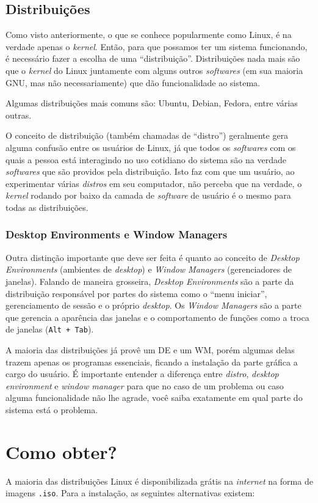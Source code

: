 \documentclass{handout_utfpr}
\begin{document}
\subsection{Distribuições}\label{distro}
Como visto anteriormente, o que se conhece popularmente como Linux, é na verdade apenas o \textit{kernel}. Então, para que possamos ter um sistema funcionando, é necessário fazer a escolha de uma ``distribuição''. Distribuições nada mais são que o \textit{kernel} do Linux juntamente com alguns outros \textit{softwares} (em sua maioria GNU, mas não necessariamente) que dão funcionalidade ao sistema.

Algumas distribuições mais comuns são: Ubuntu, Debian, Fedora, entre várias outras.

O conceito de distribuição (também chamadas de ``distro'') geralmente gera alguma confusão entre os usuários de Linux, já que todos os \textit{softwares} com os quais a pessoa está interagindo no uso cotidiano do sistema são na verdade \textit{softwares} que são providos pela distribuição. Isto faz com que um usuário, ao experimentar várias \textit{distros} em seu computador, não perceba que na verdade, o \textit{kernel} rodando por baixo da camada de \textit{software} de usuário é o mesmo para todas as distribuições.

\subsubsection{Desktop Environments e Window Managers}
Outra distinção importante que deve ser feita é quanto ao conceito de \textit{Desktop Environments} (ambientes de \textit{desktop}) e \textit{Window Managers} (gerenciadores de janelas). Falando de maneira grosseira, \textit{Desktop Environments} são a parte da distribuição responsável por partes do sistema como o ``menu iniciar'', gerenciamento de sessão e o próprio \textit{desktop}. Os \textit{Window Managers} são a parte que gerencia a aparência das janelas e o comportamento de funções como a troca de janelas (\texttt{Alt + Tab}).

A maioria das distribuições já provê um DE e um WM, porém algumas delas trazem apenas os programas essenciais, ficando a instalação da parte gráfica a cargo do usuário. É importante entender a diferença entre \textit{distro}, \textit{desktop environment} e \textit{window manager} para que no caso de um problema ou caso alguma funcionalidade não lhe agrade, você saiba exatamente em qual parte do sistema está o problema.

\section{Como obter?}
A maioria das distribuições Linux é disponibilizada grátis na \textit{internet} na forma de imagens \texttt{.iso}. Para a instalação, as seguintes alternativas existem:
\end{document}

